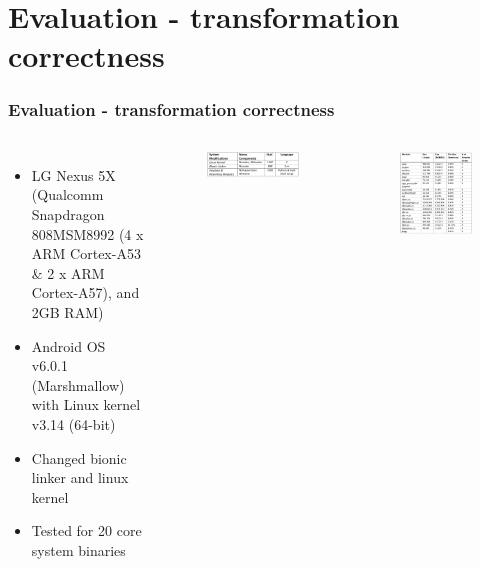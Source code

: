 \documentclass[aspectratio=169]{beamer}
\begin{document}
\section{Evaluation - transformation correctness}
\begin{frame}
\frametitle{Evaluation - transformation correctness}
\begin{columns}[c]
\begin{itemize}
\item LG Nexus 5X (Qualcomm Snapdragon 808MSM8992 (4 x ARM Cortex-A53 \& 2 x ARM Cortex-A57), and 2GB RAM)
\item Android OS v6.0.1 (Marshmallow) with Linux kernel v3.14 (64-bit)
\item Changed bionic linker and linux kernel
\item Tested for 20 core system binaries
\end{itemize}
\begin{center}
\begin{figure}
\includegraphics[width=.8\linewidth]{figures/loc.pdf}
\end{figure}
\end{center}
\begin{center}
\begin{figure}
\includegraphics[width=.8\linewidth]{figures/eval-correct.pdf}
\end{figure}
\end{center}
\end{columns}
\end{frame}
\end{document}
